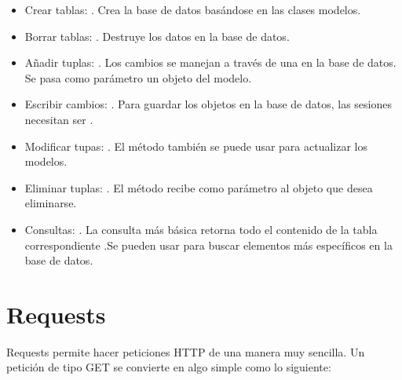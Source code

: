 \begin{itemize}
\item
Crear tablas: .
Crea la base de datos basándose en las clases modelos.
\item
Borrar tablas: .
Destruye los datos en la base de datos.
\item
Añadir tuplas: .
Los cambios  se manejan a través de una  en la base de datos. Se pasa como parámetro un objeto del modelo.
\item
Escribir cambios: .
Para guardar los objetos en la base de datos, las sesiones necesitan ser .
\item
Modificar tupas:  .
El método  también se puede usar para actualizar los modelos.
\item
Eliminar tuplas: .
El método  recibe como parámetro al objeto que desea eliminarse.
\item
Consultas:  .
La consulta más básica retorna todo el contenido de la tabla correspondiente .Se pueden usar  para buscar elementos más específicos en la base de datos.
\end{itemize}

\section*{Requests}
\label{\detokenize{chapter_two/desc_cloudnao:requests}}
Requests permite hacer peticiones HTTP de una manera muy sencilla. Un petición
de tipo GET se convierte en algo simple como lo siguiente:

